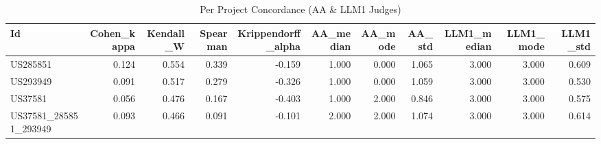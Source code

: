 \begin{table}
\caption{Per Project Concordance (AA & LLM1 Judges)}
\label{tab:per_project_concordance_AA_LLM1}
\begin{tabular}{lrrrrrrrrrr}
\toprule
Id & Cohen_kappa & Kendall_W & Spearman & Krippendorff_alpha & AA_median & AA_mode & AA_std & LLM1_median & LLM1_mode & LLM1_std \\
\midrule
US285851 & 0.124 & 0.554 & 0.339 & -0.159 & 1.000 & 0.000 & 1.065 & 3.000 & 3.000 & 0.609 \\
US293949 & 0.091 & 0.517 & 0.279 & -0.326 & 1.000 & 0.000 & 1.059 & 3.000 & 3.000 & 0.530 \\
US37581 & 0.056 & 0.476 & 0.167 & -0.403 & 1.000 & 2.000 & 0.846 & 3.000 & 3.000 & 0.575 \\
US37581_285851_293949 & 0.093 & 0.466 & 0.091 & -0.101 & 2.000 & 2.000 & 1.074 & 3.000 & 3.000 & 0.614 \\
\bottomrule
\end{tabular}
\end{table}
